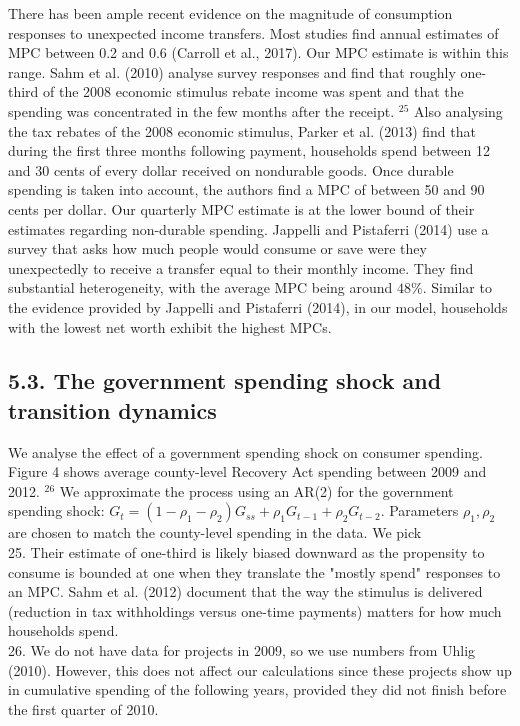 \documentclass[10pt]{article}
\begin{document}
There has been ample recent evidence on the magnitude of consumption responses to unexpected income transfers. Most studies find annual estimates of MPC between 0.2 and 0.6 (Carroll et al., 2017). Our MPC estimate is within this range. Sahm et al. (2010) analyse survey responses and find that roughly one-third of the 2008 economic stimulus rebate income was spent and that the spending was concentrated in the few months after the receipt. ${ }^{25}$ Also analysing the tax rebates of the 2008 economic stimulus, Parker et al. (2013) find that during the first three months following payment, households spend between 12 and 30 cents of every dollar received on nondurable goods. Once durable spending is taken into account, the authors find a MPC of between 50 and 90 cents per dollar. Our quarterly MPC estimate is at the lower bound of their estimates regarding non-durable spending. Jappelli and Pistaferri (2014) use a survey that asks how much people would consume or save were they unexpectedly to receive a transfer equal to their monthly income. They find substantial heterogeneity, with the average MPC being around $48 \%$. Similar to the evidence provided by Jappelli and Pistaferri (2014), in our model, households with the lowest net worth exhibit the highest MPCs.

\subsection*{5.3. The government spending shock and transition dynamics}
We analyse the effect of a government spending shock on consumer spending. Figure 4 shows average county-level Recovery Act spending between 2009 and 2012. ${ }^{26}$ We approximate the process using an AR(2) for the government spending shock: $G_{t}=\left(1-\rho_{1}-\rho_{2}\right) G_{s s}+\rho_{1} G_{t-1}+ \rho_{2} G_{t-2}$. Parameters $\rho_{1}, \rho_{2}$ are chosen to match the county-level spending in the data. We pick\\
25. Their estimate of one-third is likely biased downward as the propensity to consume is bounded at one when they translate the "mostly spend" responses to an MPC. Sahm et al. (2012) document that the way the stimulus is delivered (reduction in tax withholdings versus one-time payments) matters for how much households spend.\\
26. We do not have data for projects in 2009, so we use numbers from Uhlig (2010). However, this does not affect our calculations since these projects show up in cumulative spending of the following years, provided they did not finish before the first quarter of 2010.
\end{document}
